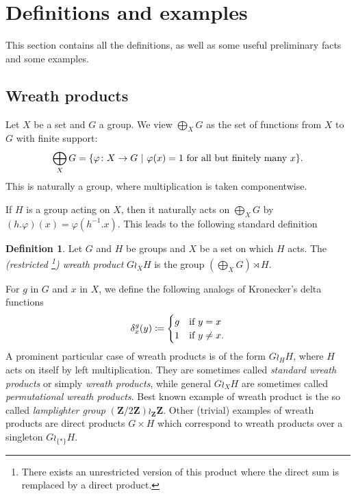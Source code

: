 \documentclass[a4paper]{article}
\theoremstyle{definition}
\newtheorem{defn}[lem]{Definition}
\newcommand*{\field}[1]{\mathbf{#1}}
\newcommand*{\Z}{\field{Z}}
\newcommand{\setst}[2]{\{#1\ |\ #2\}}
\begin{document}
\section{Definitions and examples}\label{Section:Def}
This section contains all the definitions, as well as some useful preliminary facts and some examples.
%
%
%
%
%
%
%
%
%
%
\subsection{Wreath products}
%
%
%
%
%
Let $X$ be a set and $G$ a group.
We view $\bigoplus_XG$ as the set of functions from $X$ to $G$ with finite support:
\[
	\bigoplus_XG=\setst{\varphi\colon X\to G}{\varphi(x)=1 \textnormal{ for all but finitely many }x}.
\]
This is naturally a group, where multiplication is taken componentwise.

If $H$ is a group acting on $X$, then it naturally acts on $\bigoplus_XG$
by $(h.\varphi)(x)=\varphi(h^{-1}.x)$.
This leads to the following standard definition
\begin{defn}\label{Def:WreathProd}
Let $G$ and $H$ be groups and $X$ be a set on which $H$ acts.
The \emph{(restricted \footnote{There exists an unrestricted version of this product where the direct sum is remplaced by a direct product.}) wreath product} $G\wr_XH$ is the group $(\bigoplus_XG)\rtimes H$.
\end{defn}
For $g$ in $G$ and $x$ in $X$, we define the following analogs of Kronecker's delta functions
\begin{equation*}
\delta_x^g (y) \coloneqq
\begin{cases}
g & \textnormal{if }y = x \\
1 & \textnormal{if } y \neq x.
\end{cases}
\end{equation*}
A prominent particular case of wreath products is of the form $G\wr_HH$, where $H$ acts on itself by left multiplication.
They are sometimes called \emph{standard wreath products} or simply \emph{wreath products}, while general $G\wr_XH$ are sometimes called \emph{permutational wreath products}.
Best known example of wreath product is the so called \emph{lamplighter group} $(\Z/2\Z)\wr_\Z\Z$.
Other (trivial) examples of wreath products are direct products $G\times H$ which correspond to wreath products over a singleton $G\wr_{\{*\}}H$.
%
%
%
%
%
%
%
%
%
%
\end{document}
